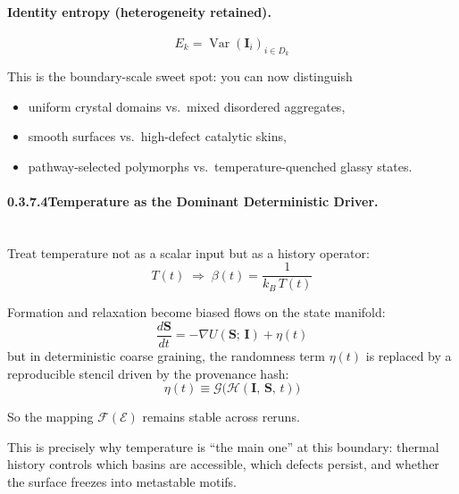 \documentclass[11pt, a4paper, oneside]{article}
\theoremstyle{definition}
\theoremstyle{remark}
\newcommand{\boldI}{\mathbf{I}}
\newcommand{\boldS}{\mathbf{S}}
\DeclareMathOperator{\Var}{Var}
\begin{document}
\paragraph{Identity entropy (heterogeneity retained).}
\begin{equation}
  E_k = \Var(\boldI_i)_{i \in D_k}
  \label{eq:identity-entropy}
\end{equation}

\medskip\noindent
This is the boundary-scale sweet spot: you can now distinguish
\begin{itemize}
  \item uniform crystal domains vs.\ mixed disordered aggregates,
  \item smooth surfaces vs.\ high-defect catalytic skins,
  \item pathway-selected polymorphs vs.\ temperature-quenched glassy
        states.
\end{itemize}

\paragraph{0.3.7.4\quad Temperature as the Dominant Deterministic
  Driver.}
\label{sec:temperature-driver}
\mbox{}\\[0.4em]

Treat temperature not as a scalar input but as a history operator:
\begin{equation}
  T(t) \;\Rightarrow\;
  \beta(t) = \frac{1}{k_B\, T(t)}
  \label{eq:inverse-temp}
\end{equation}

Formation and relaxation become biased flows on the state manifold:
\begin{equation}
  \frac{d\boldS}{dt} =
  -\nabla U(\boldS;\,\boldI) + \eta(t)
  \label{eq:biased-flow}
\end{equation}
but in deterministic coarse graining, the randomness term $\eta(t)$
is replaced by a reproducible stencil driven by the provenance hash:
\begin{equation}
  \eta(t) \equiv
  \mathcal{G}\!\bigl(\mathcal{H}(\boldI,\,\boldS,\,t)\bigr)
  \label{eq:deterministic-noise}
\end{equation}

So the mapping $\mathcal{F}(\mathcal{E})$ remains stable across
reruns.

This is precisely why temperature is ``the main one'' at this
boundary: thermal history controls which basins are accessible, which
defects persist, and whether the surface freezes into metastable
motifs.
\end{document}
